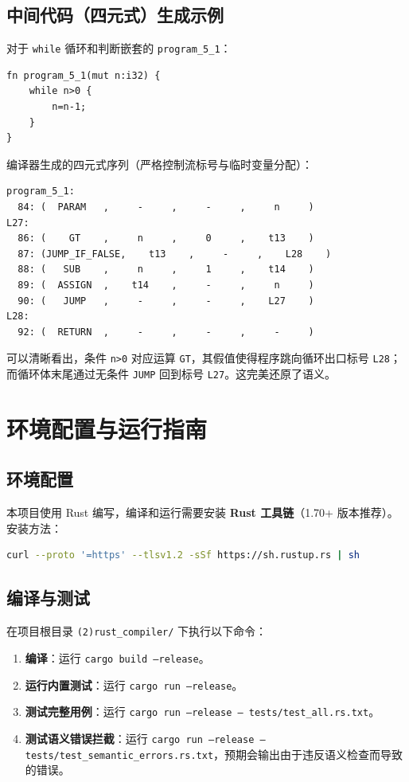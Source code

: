 \documentclass[12pt,a4paper]{ctexart}
\begin{document}
\subsection{中间代码（四元式）生成示例}

对于 \texttt{while} 循环和判断嵌套的 \texttt{program\_5\_1}：
\begin{lstlisting}[language=RustLike]
fn program_5_1(mut n:i32) {
    while n>0 {
        n=n-1;
    }
}
\end{lstlisting}

编译器生成的四元式序列（严格控制流标号与临时变量分配）：
\begin{lstlisting}[basicstyle=\footnotesize\ttfamily]
program_5_1:
  84: (  PARAM   ,     -     ,     -     ,     n     )
L27:
  86: (    GT    ,     n     ,     0     ,    t13    )
  87: (JUMP_IF_FALSE,    t13    ,     -     ,    L28    )
  88: (   SUB    ,     n     ,     1     ,    t14    )
  89: (  ASSIGN  ,    t14    ,     -     ,     n     )
  90: (   JUMP   ,     -     ,     -     ,    L27    )
L28:
  92: (  RETURN  ,     -     ,     -     ,     -     )
\end{lstlisting}
可以清晰看出，条件 \texttt{n>0} 对应运算 \texttt{GT}，其假值使得程序跳向循环出口标号 \texttt{L28}；而循环体末尾通过无条件 \texttt{JUMP} 回到标号 \texttt{L27}。这完美还原了语义。

\section{环境配置与运行指南}

\subsection{环境配置}
本项目使用 Rust 编写，编译和运行需要安装 \textbf{Rust 工具链}（1.70+ 版本推荐）。安装方法：
\begin{lstlisting}[language=bash]
curl --proto '=https' --tlsv1.2 -sSf https://sh.rustup.rs | sh
\end{lstlisting}

\subsection{编译与测试}
在项目根目录 \texttt{(2)rust\_compiler/} 下执行以下命令：
\begin{enumerate}
    \item \textbf{编译}：运行 \texttt{cargo build --release}。
    \item \textbf{运行内置测试}：运行 \texttt{cargo run --release}。
    \item \textbf{测试完整用例}：运行 \texttt{cargo run --release -- tests/test\_all.rs.txt}。
    \item \textbf{测试语义错误拦截}：运行 \texttt{cargo run --release -- tests/test\_semantic\_errors.rs.txt}，预期会输出由于违反语义检查而导致的错误。
\end{enumerate}
\end{document}
